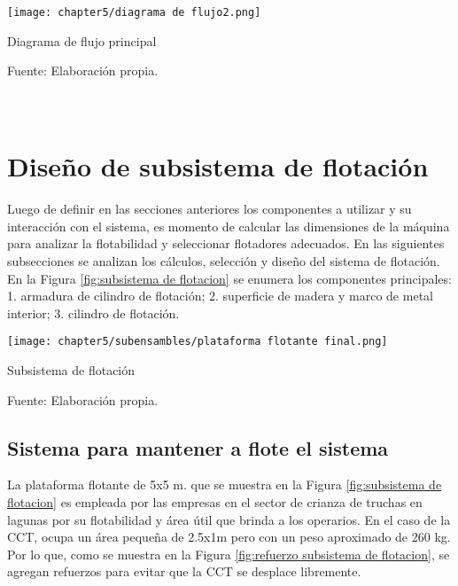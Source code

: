 \begin{myfigure}[H]
	\footnotesize\centering
	\texttt{[image: chapter5/diagrama de flujo2.png]}
	\caption{Diagrama de flujo principal}
	\begin{myflushcenter}
		Fuente: Elaboración propia.
	\end{myflushcenter}
	\label{fig:diagrama de flujo2}
\end{myfigure}

\pagestyle{myportland}
\doublespacing
\chapter[\quad\quad\quad\quad ----- Diseño de subsistema de flotación]{\\ Diseño de subsistema de flotación}
\thispagestyle{myportland}
\label{ssec:diseno de subsistema de flotacion}

Luego de definir en las secciones anteriores los componentes a utilizar y su interacción con el sistema, es momento de calcular las dimensiones de la máquina para analizar la flotabilidad y seleccionar flotadores adecuados. En las siguientes subsecciones se analizan los cálculos, selección y diseño del sistema de flotación. En la Figura \ref{fig:subsistema de flotacion} se enumera los componentes principales: 1. armadura de cilindro de flotación; 2. superficie de madera y marco de metal interior; 3. cilindro de flotación.

\begin{myfigure}[H]
	\footnotesize\centering
	\texttt{[image: chapter5/subensambles/plataforma flotante final.png]}
	\caption{Subsistema de flotación}
	\begin{myflushcenter}
		Fuente: Elaboración propia.
	\end{myflushcenter}
	\label{fig:subsistema de flotacion}
\end{myfigure}

\section{Sistema para mantener a flote el sistema}

La plataforma flotante de 5x5 m. que se muestra en la Figura \ref{fig:subsistema de flotacion} es empleada por las empresas en el sector de crianza de truchas en lagunas por su flotabilidad y área útil que brinda a los operarios. En el caso de la CCT, ocupa un área pequeña de 2.5x1m pero con un peso aproximado de 260 kg. Por lo que, como se muestra en la Figura \ref{fig:refuerzo subsistema de flotacion}, se agregan refuerzos para evitar que la CCT se desplace libremente.

